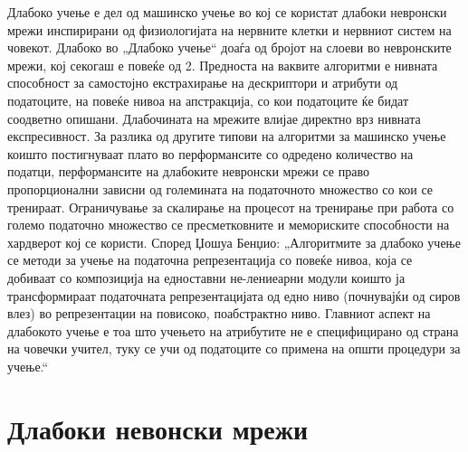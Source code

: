 Длабоко учење е дел од машинско учење во кој се користат длабоки невронски мрежи инспирирани од физиологијата на нервните клетки и нервниот систем на човекот. Длабоко во „Длабоко учење“ доаѓа од бројот на слоеви во невронските мрежи, кој секогаш е повеќе од 2. Предноста на ваквите алгоритми е нивната способност за самостојно екстрахирање на дескриптори и атрибути од податоците, на повеќе нивоа на апстракција, со кои податоците ќе бидат соодветно опишани. Длабочината на мрежите влијае директно врз нивната експресивност. За разлика од другите типови на алгоритми за машинско учење коишто постигнуваат плато во перформансите со одредено количество на податци, перформансите на длабоките невронски мрежи се право пропорционални зависни од големината на податочното множество со кои се тренираат. Ограничување за скалирање на процесот на тренирање при работа со големо податочно множество се пресметковните и мемориските способности на хардверот кој се користи.
Според Џошуа Бенџио: „Алгоритмите за длабоко учење се методи за учење на податочна репрезентација со повеќе нивоа, која се добиваат со композиција на едноставни не-лениеарни модули коишто ја трансформираат податочната репрезентацијата од едно ниво (почнувајќи од сиров влез) во репрезентации на повисоко, поабстрактно ниво. Главниот аспект на длабокото учење е тоа што учењето на атрибутите не е специфицирано од страна на човечки учител, туку се учи од податоците со примена на општи процедури за учење.“
 
\section{Длабоки невонски мрежи}

